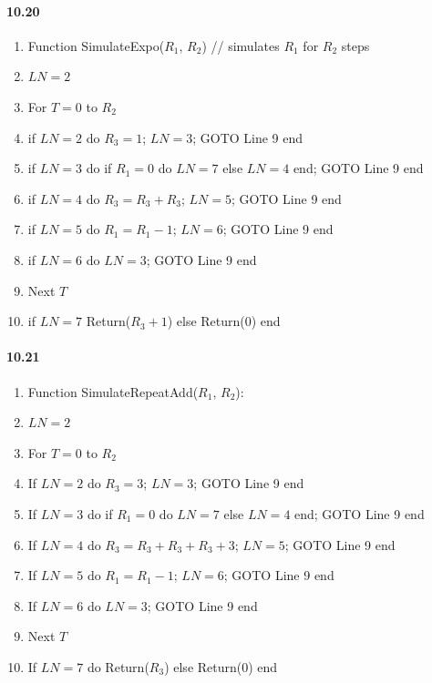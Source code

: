 \documentclass{article}
\begin{document}
\paragraph{10.20}
\begin{enumerate}
	\item Function SimulateExpo($R_1$, $R_2$) // simulates $R_1$ for $R_2$ steps
	\item $LN = 2$
	\item For $T = 0$ to $R_2$
	\item if $LN = 2$ do $R_3 = 1$; $LN=3$; GOTO Line 9 end
	\item if $LN = 3$ do if $R_1=0$ do $LN=7$ else $LN=4$ end; GOTO Line 9 end
	\item if $LN = 4$ do $R_3 = R_3 + R_3$; $LN=5$; GOTO Line 9 end
	\item if $LN = 5$ do $R_1 = R_1 - 1$; $LN=6$; GOTO Line 9 end
	\item if $LN = 6$ do $LN = 3$; GOTO Line 9 end
	\item Next $T$
	\item if $LN = 7$ Return($R_3 + 1$) else Return($0$) end
\end{enumerate}

\paragraph{10.21}
\begin{enumerate}
	\item Function SimulateRepeatAdd($R_1$, $R_2$):
	\item $LN=2$
	\item For $T=0$ to $R_2$
	\item If $LN=2$ do $R_3=3$; $LN=3$; GOTO Line 9 end
	\item If $LN=3$ do if $R_1=0$ do $LN=7$ else $LN=4$ end; GOTO Line 9 end
	\item If $LN=4$ do $R_3=R_3+R_3+R_3+3$; $LN=5$; GOTO Line 9 end
	\item If $LN=5$ do $R_1=R_1-1$; $LN=6$; GOTO Line 9 end
	\item If $LN=6$ do $LN=3$; GOTO Line 9 end
	\item Next $T$
	\item If $LN=7$ do Return($R_3$) else Return($0$) end
\end{enumerate}
\end{document}
